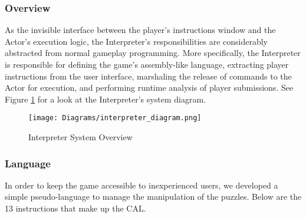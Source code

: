 \subsubsection{Overview}
As the invisible interface between the player's instructions window and the Actor's execution logic, the Interpreter's responsibilities are considerably abstracted from normal gameplay programming. More specifically, the Interpreter is responsible for defining the game's assembly-like language, extracting player instructions from the user interface, marshaling the release of commands to the Actor for execution, and performing runtime analysis of player submissions. See Figure \ref{fig:interpreter_system_overview} for a look at the Interpreter's system diagram.

\begin{figure}[!hb]
    \caption{Interpreter System Overview}
    \label{fig:interpreter_system_overview}
    \centering
    \texttt{[image: Diagrams/interpreter\_diagram.png]}
\end{figure}

\subsubsection{Language}
In order to keep the game accessible to inexperienced users, we developed a simple
pseudo-language to manage the manipulation of the puzzles. Below are the 13 instructions that 
make up the CAL.

